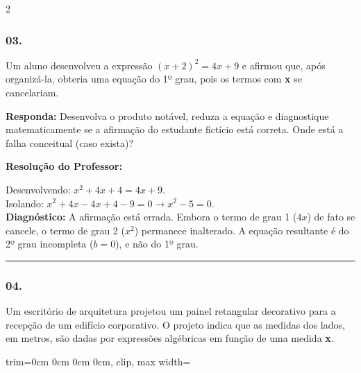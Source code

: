 \begin{multicols*}{2}
\par\vspace{\espacoQuestao}

\subsubsection*{03.} Um aluno desenvolveu a expressão $ (x + 2)^2 = 4x + 9 $ e afirmou que, após organizá-la, obteria uma equação do 1º grau, pois os termos com \textbf{x} se cancelariam.
\begin{boxresponda}
\textbf{Responda:} Desenvolva o produto notável, reduza a equação e diagnostique matematicamente se a afirmação do estudante fictício está correta. Onde está a falha conceitual (caso exista)?
\end{boxresponda}

\ifgabarito
    \begin{tcolorbox}[colback=CorTitUm!5, colframe=CorTitUm, boxrule=1pt, arc=4pt, left=6pt, right=6pt, top=6pt, bottom=6pt]
    \small\textbf{\textcolor{CorTitUm}{Resolução do Professor:}}\par\vspace{0.1cm}
    \color{CinzaEscuro}
    Desenvolvendo: $x^2 + 4x + 4 = 4x + 9$.\\
    Isolando: $x^2 + 4x - 4x + 4 - 9 = 0 \rightarrow x^2 - 5 = 0$.\\
    \textbf{Diagnóstico:} A afirmação está errada. Embora o termo de grau 1 ($4x$) de fato se cancele, o termo de grau 2 ($x^2$) permanece inalterado. A equação resultante é do 2º grau incompleta ($b=0$), e não do 1º grau.
    \end{tcolorbox}
\fi

\par\vspace{\espacoQuestao}

\noindent\textcolor{CorLinha}{\rule{\linewidth}{0.5pt}} 
\par\vspace{\espacoPreQuestao}
\subsubsection*{04.} Um escritório de arquitetura projetou um painel retangular decorativo para a recepção de um edifício corporativo. O projeto indica que as medidas dos lados, em metros, são dadas por expressões algébricas em função de uma medida \textbf{x}.

\begin{center}
\begin{adjustbox}{trim=0cm 0cm 0cm 0cm, clip, max width=\larguraTikz}
\end{adjustbox}
\end{center}
\end{multicols*}

